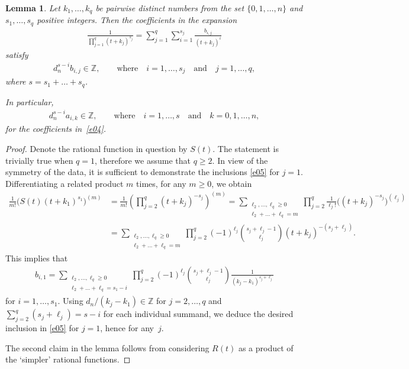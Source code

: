 \documentclass[11pt]{article}
\newtheorem{lemma}{Lemma}
\begin{document}
\begin{lemma}\label{l1}
Let $k_1,\dots,k_q$ be pairwise distinct numbers from the set $\{0,1,\dots,n\}$ and $s_1,\dots,s_q$ positive integers. Then the coefficients in the expansion
\begin{gather*}
\frac1{\prod_{j=1}^q(t+k_j)^{s_j}} =\sum_{j=1}^q\sum_{i=1}^{s_j}\frac{b_{i,j}}{(t+k_j)^i}
\end{gather*}
satisfy
\begin{gather} d_n^{s-i}b_{i,j}\in\mathbb Z, \qquad\text{where}\quad i=1,\dots,s_j \quad \text{and}\quad j=1,\dots,q, \label{e05}
\end{gather}
where $s=s_1+\dots+s_q$.

In particular,
\begin{gather}
d_n^{s-i}a_{i,k}\in\mathbb Z, \qquad\text{where}\quad i=1,\dots,s \quad \text{and}\quad k=0,1,\dots,n, \label{e06}
\end{gather}
for the coefficients in~\eqref{e04}.
\end{lemma}

\begin{proof} Denote the rational function in question by $S(t)$. The statement is trivially true when $q=1$, therefore we assume that $q\ge2$. In view of the symmetry of the data, it is sufficient to demonstrate the inclusions \eqref{e05} for $j=1$. Differentiating a related product $m$ times, for any $m\ge0$, we obtain
\begin{align*}
\frac1{m!}\bigl(S(t)(t+k_1)^{s_1}\bigr)^{(m)}
&=\frac1{m!}\left(\prod_{j=2}^q(t+k_j)^{-s_j}\right)^{(m)}
=\sum_{\substack{\ell_2,\dots,\ell_q\ge0\\ \ell_2+\dots+\ell_q=m}}\prod_{j=2}^q\frac1{\ell_j!}\bigl((t+k_j)^{-s_j}\bigr)^{(\ell_j)}\\
&=\sum_{\substack{\ell_2,\dots,\ell_q\ge0\\ \ell_2+\dots+\ell_q=m}}\prod_{j=2}^q(-1)^{\ell_j}\binom{s_j+\ell_j-1}{\ell_j}(t+k_j)^{-(s_j+\ell_j)}.
\end{align*}
This implies that
\begin{gather*}
b_{i,1}=\sum_{\substack{\ell_2,\dots,\ell_q\ge0\\ \ell_2+\dots+\ell_q=s_1-i}}
\prod_{j=2}^q(-1)^{\ell_j}\binom{s_j+\ell_j-1}{\ell_j}\frac1{(k_j-k_1)^{s_j+\ell_j}}
\end{gather*}
for $i=1,\dots,s_1$. Using $d_n/(k_j-k_1)\in\mathbb Z$ for $j=2,\dots,q$ and $\sum_{j=2}^q(s_j+\ell_j)=s-i$ for each individual summand, we deduce the desired inclusion in \eqref{e05} for $j=1$, hence for any~$j$.

The second claim in the lemma follows from considering $R(t)$ as a product of the `simpler' rational functions.
\end{proof}
\end{document}
